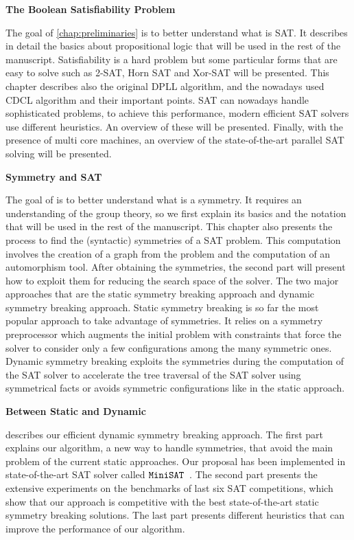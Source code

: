 \textbf{The Boolean Satisfiability Problem}

The goal of \cref{chap:preliminaries} is to better understand what is SAT. 
It describes in detail the basics
about propositional logic that will be used in the rest of the manuscript. Satisfiability is a hard
problem but some particular forms that are easy to solve such as 2-SAT, Horn SAT and Xor-SAT will be presented.
This chapter describes also the original DPLL algorithm, and the
nowadays used CDCL algorithm and their important points. SAT can nowadays handle
sophisticated problems, to achieve this performance, modern efficient SAT solvers use different heuristics.
 An overview of these will be presented. Finally, with the presence of multi
core machines, an overview of the state-of-the-art parallel SAT solving will be presented.


\textbf{Symmetry and SAT}

The goal of  is to better understand what is a symmetry. 
It requires an understanding of the group theory, so we first explain its basics and the notation that will be
 used in the rest of the manuscript.
This chapter also presents the process to find the (syntactic) symmetries of a SAT problem.
 This computation involves the creation of a graph from the problem and the computation of an
automorphism tool. After obtaining the symmetries, the second part will present how to
exploit them for reducing the search space of the solver. The two major approaches that
are the static symmetry breaking approach and dynamic symmetry breaking approach.
Static symmetry breaking is so far the most popular approach to take advantage of symmetries. It relies on a symmetry preprocessor which augments the initial problem with constraints that force the solver to consider only a few configurations among the many symmetric ones.
Dynamic symmetry breaking exploits the symmetries during the computation of the SAT solver to accelerate the
tree traversal of the SAT solver using symmetrical facts or avoids symmetric configurations like in the 
static approach.

\textbf{Between Static and Dynamic}

 describes our efficient dynamic symmetry breaking approach.
The first part explains our algorithm, a new way to handle symmetries, that avoid the main problem
of the current static approaches. Our proposal has been implemented in state-of-the-art
SAT solver called $\texttt{MiniSAT}$~\cite{een2003extensible}. The second part presents the extensive experiments on the benchmarks of last six SAT competitions,
which show that our approach is competitive with the best state-of-the-art static symmetry breaking solutions.
The last part presents different heuristics that can improve the performance of our algorithm.


